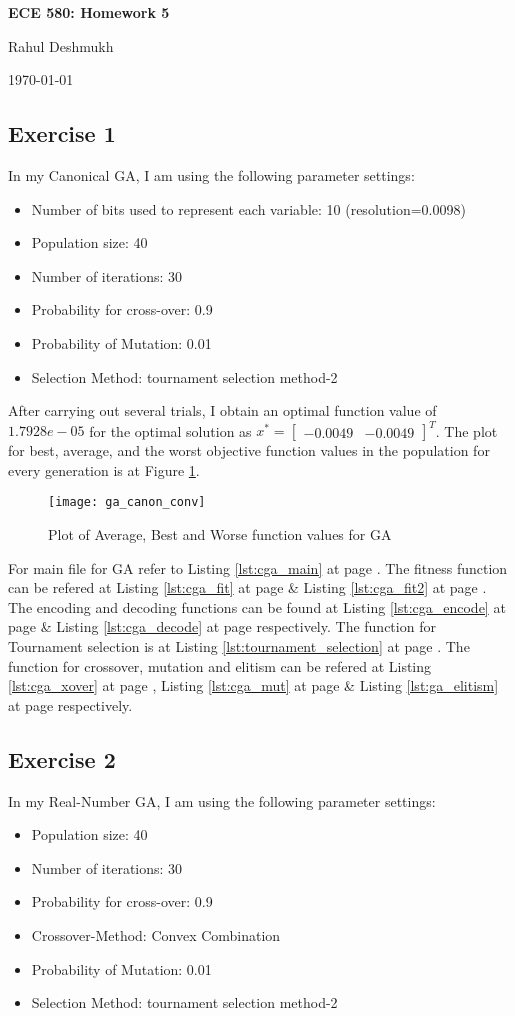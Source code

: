 \documentclass[11pt]{article}
\newcommand{\mat}[1]{\begin{bmatrix}#1\end{bmatrix}}
\newcommand{\reflst}[1]{Listing \ref{#1} at page \pageref{#1}}
\newcommand{\reffig}[1]{Figure \ref{#1}}
\begin{document}
\begin{center}
\Large{\textbf{ECE 580: Homework 5}}

Rahul Deshmukh

\today
\end{center}

\subsection*{Exercise 1} 
In my Canonical GA, I am using the following parameter settings:
\begin{itemize}
 \item Number of bits used to represent each variable: 10 (resolution=0.0098)
 \item Population size: 40
 \item Number of iterations: 30
 \item Probability for cross-over: 0.9
 \item Probability of Mutation: 0.01
 \item Selection Method: tournament selection method-2
\end{itemize}

\noindent After carrying out several trials, I obtain an optimal function value of $1.7928e-05$ for the optimal solution as
$x^* = \mat{-0.0049&   -0.0049 }^T$. The plot for best, average, and the worst objective function values in the population for every generation is at \reffig{fig:ga_canon_conv}.

\begin{figure}[!h]
 \centering
 \texttt{[image: ga\_canon\_conv]}
 \caption{Plot of Average, Best and Worse function values for GA}
 \label{fig:ga_canon_conv}
\end{figure}

\noindent For main file for GA refer to \reflst{lst:cga_main}. The fitness function can be refered at \reflst{lst:cga_fit} \&  \reflst{lst:cga_fit2}. The encoding and decoding functions can be found at \reflst{lst:cga_encode} \& \reflst{lst:cga_decode} respectively. The function for Tournament selection is at \reflst{lst:tournament_selection}. The function for crossover, mutation and elitism can be refered at \reflst{lst:cga_xover}, \reflst{lst:cga_mut} \& \reflst{lst:ga_elitism} respectively.

%
\clearpage
\vspace{2ex}
%
\subsection*{Exercise 2} 
In my Real-Number GA, I am using the following parameter settings:
\begin{itemize}
 \item Population size: 40
 \item Number of iterations: 30
 \item Probability for cross-over: 0.9
 \item Crossover-Method: Convex Combination
 \item Probability of Mutation: 0.01
 \item Selection Method: tournament selection method-2
\end{itemize}
\end{document}
